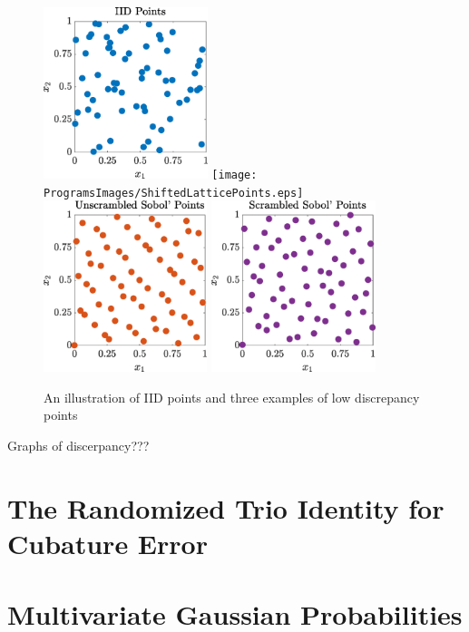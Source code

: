 \documentclass[graybox,footinfo]{svmult}
\begin{document}
\begin{figure}
	\centering
	\includegraphics[height=5cm]{ProgramsImages/IIDPoints.eps} \quad
	\texttt{[image: ProgramsImages/ShiftedLatticePoints.eps]} \\
	\includegraphics[height=5cm]{ProgramsImages/USobolPoints.eps} \quad
	\includegraphics[height=5cm]{ProgramsImages/SSobolPoints.eps}
	\caption{An illustration of IID points and three examples of low discrepancy points 
	\label{FJH:fig:plotsdiffpts}}
\end{figure}



Graphs of discerpancy???

\section{The Randomized Trio Identity for Cubature Error}

\section{Multivariate Gaussian Probabilities}
\end{document}
